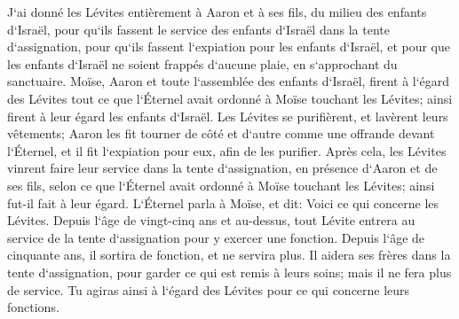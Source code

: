 \verse J`ai donné les Lévites entièrement à Aaron et à ses fils, du milieu des enfants d`Israël, pour qu`ils fassent le service des enfants d`Israël dans la tente d`assignation, pour qu`ils fassent l`expiation pour les enfants d`Israël, et pour que les enfants d`Israël ne soient frappés d`aucune plaie, en s`approchant du sanctuaire. 
\verse Moïse, Aaron et toute l`assemblée des enfants d`Israël, firent à l`égard des Lévites tout ce que l`Éternel avait ordonné à Moïse touchant les Lévites; ainsi firent à leur égard les enfants d`Israël. 
\verse Les Lévites se purifièrent, et lavèrent leurs vêtements; Aaron les fit tourner de côté et d`autre comme une offrande devant l`Éternel, et il fit l`expiation pour eux, afin de les purifier. 
\verse Après cela, les Lévites vinrent faire leur service dans la tente d`assignation, en présence d`Aaron et de ses fils, selon ce que l`Éternel avait ordonné à Moïse touchant les Lévites; ainsi fut-il fait à leur égard. 
\verse L`Éternel parla à Moïse, et dit: 
\verse Voici ce qui concerne les Lévites. Depuis l`âge de vingt-cinq ans et au-dessus, tout Lévite entrera au service de la tente d`assignation pour y exercer une fonction. 
\verse Depuis l`âge de cinquante ans, il sortira de fonction, et ne servira plus. 
\verse Il aidera ses frères dans la tente d`assignation, pour garder ce qui est remis à leurs soins; mais il ne fera plus de service. Tu agiras ainsi à l`égard des Lévites pour ce qui concerne leurs fonctions. 

